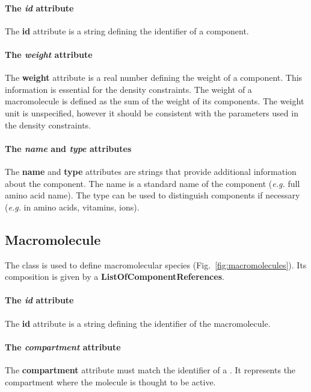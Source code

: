 \paragraph{The \textit{id} attribute}
The \textbf{id} attribute is a string defining the identifier of a component.

\paragraph{The \textit{weight} attribute}
The \textbf{weight} attribute is a real number defining the weight of a
component.
This information is essential for the density constraints.
The weight of a macromolecule is defined as the sum of the weight of its
components.
The weight unit is unspecified, however it should be consistent with the parameters
used in the density constraints.

\paragraph{The \textit{name} and \textit{type} attributes}
The \textbf{name} and \textbf{type} attributes are strings that provide
additional information about the component.
The name is a standard name of the component
(\textit{e.g.} full amino acid name).
The type can be used to distinguish components if necessary
(\textit{e.g.} in amino acids, vitamins, ions).


\subsection{Macromolecule}
\label{sec:macromolecule}

The \macromolecule{} class is used to define macromolecular species
(Fig.~\ref{fig:macromolecules}).
Its composition is given by a \textbf{ListOfComponentReferences}.

\paragraph{The \textit{id} attribute}
The \textbf{id} attribute is a string defining the identifier of
the macromolecule.

\paragraph{The \textit{compartment} attribute}
The \textbf{compartment} attribute must match the identifier of a \compartment.
It represents the compartment where the molecule is thought to be active.


